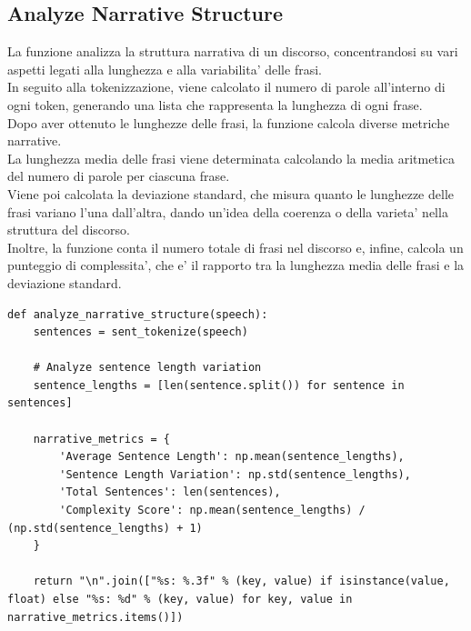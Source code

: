 \documentclass{article}
\begin{document}
		\subsection{Analyze Narrative Structure}
La funzione analizza la struttura narrativa di un discorso, concentrandosi su vari aspetti legati alla lunghezza e alla variabilita' delle frasi. \\In seguito alla tokenizzazione, viene calcolato il numero di parole all'interno di ogni token, generando una lista che rappresenta la lunghezza di ogni frase.\\
Dopo aver ottenuto le lunghezze delle frasi, la funzione calcola diverse metriche narrative. \\La lunghezza media delle frasi viene determinata calcolando la media aritmetica del numero di parole per ciascuna frase.\\ Viene poi calcolata la deviazione standard, che misura quanto le lunghezze delle frasi variano l'una dall'altra, dando un'idea della coerenza o della varieta' nella struttura del discorso. \\Inoltre, la funzione conta il numero totale di frasi nel discorso e, infine, calcola un punteggio di complessita', che e' il rapporto tra la lunghezza media delle frasi e la deviazione standard.		
	\begin{lstlisting}
def analyze_narrative_structure(speech):
	sentences = sent_tokenize(speech)
	
	# Analyze sentence length variation
	sentence_lengths = [len(sentence.split()) for sentence in sentences]
	
	narrative_metrics = {
		'Average Sentence Length': np.mean(sentence_lengths),
		'Sentence Length Variation': np.std(sentence_lengths),
		'Total Sentences': len(sentences),
		'Complexity Score': np.mean(sentence_lengths) / (np.std(sentence_lengths) + 1)
	}

	return "\n".join(["%s: %.3f" % (key, value) if isinstance(value, float) else "%s: %d" % (key, value) for key, value in narrative_metrics.items()])

	\end{lstlisting}
	\newpage		
\end{document}
